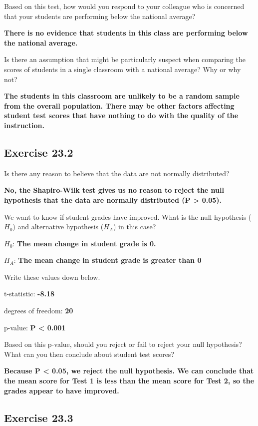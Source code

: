\documentclass[
  openany]{scrbook}
\begin{document}
Based on this test, how would you respond to your colleague who is concerned that your students are performing below the national average?

\textbf{There is no evidence that students in this class are performing below the national average.}

Is there an assumption that might be particularly suspect when comparing the scores of students in a single classroom with a national average? Why or why not?

\textbf{The students in this classroom are unlikely to be a random sample from the overall population. There may be other factors affecting student test scores that have nothing to do with the quality of the instruction.}

\hypertarget{exercise-23.2}{%
\subsection{Exercise 23.2}\label{exercise-23.2}}

Is there any reason to believe that the data are not normally distributed?

\textbf{No, the Shapiro-Wilk test gives us no reason to reject the null hypothesis that the data are normally distributed (P \textgreater{} 0.05).}

We want to know if student grades have improved. What is the null hypothesis (\(H_{0}\)) and alternative hypothesis (\(H_{A}\)) in this case?

\(H_{0}\): \textbf{The mean change in student grade is 0.}

\(H_{A}\): \textbf{The mean change in student grade is greater than 0}

Write these values down below.

t-statistic: \textbf{-8.18}

degrees of freedom: \textbf{20}

p-value: \textbf{P \textless{} 0.001}

Based on this p-value, should you reject or fail to reject your null hypothesis? What can you then conclude about student test scores?

\textbf{Because P \textless{} 0.05, we reject the null hypothesis. We can conclude that the mean score for Test 1 is less than the mean score for Test 2, so the grades appear to have improved.}

\hypertarget{exercise-23.3}{%
\subsection{Exercise 23.3}\label{exercise-23.3}}
\end{document}
